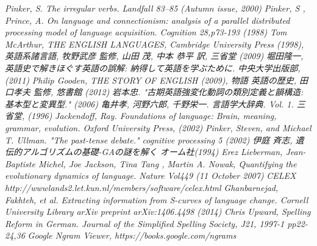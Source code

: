 \documentclass[12pt,a4j]{jarticle}
\begin{document}
\begin{thebibliography}{9}
   \emph{Pinker, S. The irregular verbs. Landfall 83–85 (Autumn issue, 2000)}
   \emph{Pinker, S , Prince, A. On language and connectionism: analysis of a parallel distributed processing model of language acquisition. Cognition 28,p73-193 (1988)}
   \emph{Tom McArthur, THE ENGLISH LANGUAGES, Cambridge University Press (1998), 英語系諸言語, 牧野武彦 監修, 山田 茂, 中本 恭平 訳, 三省堂 (2009)}
    \emph{堀田隆一, 英語史で解きほぐす英語の誤解: 納得して英語を学ぶために. 中央大学出版部, (2011)}
   \emph{Philip Gooden, THE STORY OF ENGLISH (2009), 物語 英語の歴史, 田口孝夫 監修, 悠書館 (2012)}
  \emph{岩本忠. "古期英語強変化動詞の類別定義と韻構造: 基本型と変異型." (2006)}
   \emph{亀井孝, 河野六郎, 千野栄一. 言語学大辞典. Vol. 1. 三省堂, (1996)}
  \emph{Jackendoff, Ray. Foundations of language: Brain, meaning, grammar, evolution. Oxford University Press, (2002)}
\emph{Pinker, Steven, and Michael T. Ullman. "The past-tense debate." cognitive processing 5 (2002)}
   \emph{伊庭 斉志, 遺伝的アルゴリズムの基礎-GAの謎を解く オーム社(1994)}
    \emph{Erez Lieberman, Jean-Baptiste Michel, Joe Jackson, Tina Tang , Martin A. Nowak, Quantifying the evolutionary dynamics of language. Nature Vol449 (11 October 2007)}
    \emph{CELEX http://wwwlands2.let.kun.nl/members/software/celex.html}
    \emph{Ghanbarnejad, Fakhteh, et al. Extracting information from S-curves of language change. Cornell University Library arXiv preprint arXiv:1406.4498 (2014)}
    \emph{Chris Upward, Spelling Reform in German. Journal of the Simplified Spelling Society, J21, 1997-1 pp22-24,36}
    \emph{Google Ngram Viewer, https://books.google.com/ngrams}
\end{thebibliography}
\end{document}

